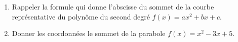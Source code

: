 
\begin{exercice}\label{exosmath-0091}

    \begin{enumerate}
        \item
            Rappeler la formule qui donne l'abscisse du sommet de la courbe représentative du polynôme du second degré \( f(x)=ax^2+bx+c\).
        \item
            Donner les coordonnées le sommet de la parabole \( f(x)=x^2-3x+5\).
    \end{enumerate}

\end{exercice}
